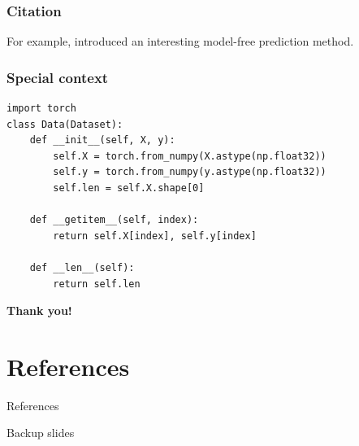 \documentclass[aspectratio=169,xcolor=x11names]{beamer}
\begin{document}
\begin{frame}[fragile] 
    \frametitle{Citation}

    For example, \cite{politis2015model} introduced an interesting model-free prediction method.
\end{frame}



\begin{frame}[fragile] %
    \frametitle{Special context}
\begin{verbatim}
import torch
class Data(Dataset):
    def __init__(self, X, y):
        self.X = torch.from_numpy(X.astype(np.float32))
        self.y = torch.from_numpy(y.astype(np.float32))
        self.len = self.X.shape[0]
       
    def __getitem__(self, index):
        return self.X[index], self.y[index]
   
    def __len__(self):
        return self.len
\end{verbatim}
\end{frame}

\begin{frame}
\color{RoyalBlue4}
    \Huge{\centerline{\textbf{Thank you!}}}
\end{frame}


\section*{References}
\footnotesize
\begin{frame}{References}
        
        
\end{frame}




\appendix 

\begin{frame}{Backup slides}


    
\end{frame}
\end{document}
